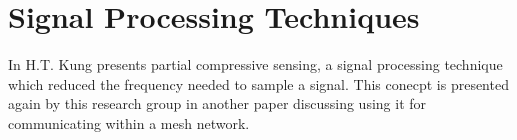 \section{Signal Processing Techniques}

In \cite{6127519} H.T. Kung presents partial compressive sensing, a signal processing technique which reduced the frequency needed to sample a signal. This conecpt
is presented again by this research group in another paper discussing using it for communicating within a mesh network.
